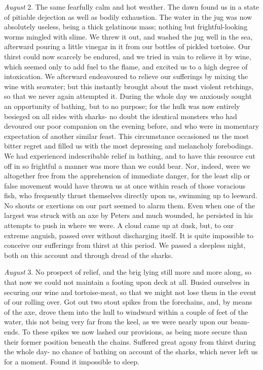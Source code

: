 \emph{August} 2. The same fearfully calm and hot weather. The dawn found us
in a state of pitiable dejection as well as bodily exhaustion. The water in the
jug was now absolutely useless, being a thick gelatinous mass; nothing but
frightful-looking worms mingled with slime. We threw it out, and washed the jug
well in the sea, afterward pouring a little vinegar in it from our bottles of
pickled tortoise. Our thirst could now scarcely be endured, and we tried in vain
to relieve it by wine, which seemed only to add fuel to the flame, and excited
us to a high degree of intoxication. We afterward endeavoured to relieve our
sufferings by mixing the wine with seawater; but this instantly brought about
the most violent retchings, so that we never again attempted it. During the
whole day we anxiously sought an opportunity of bathing, but to no purpose; for
the hulk was now entirely besieged on all sides with sharks- no doubt the
identical monsters who had devoured our poor companion on the evening before,
and who were in momentary expectation of another similar feast. This
circumstance occasioned us the most bitter regret and filled us with the most
depressing and melancholy forebodings. We had experienced indescribable relief
in bathing, and to have this resource cut off in so frightful a manner was more
than we could bear. Nor, indeed, were we altogether free from the apprehension
of immediate danger, for the least slip or false movement would have thrown us
at once within reach of those voracious fish, who frequently thrust themselves
directly upon us, swimming up to leeward. No shouts or exertions on our part
seemed to alarm them. Even when one of the largest was struck with an axe by
Peters and much wounded, he persisted in his attempts to push in where we were.
A cloud came up at dusk, but, to our extreme anguish, passed over without
discharging itself. It is quite impossible to conceive our sufferings from
thirst at this period. We passed a sleepless night, both on this account and
through dread of the sharks. 

\emph{August} 3. No prospect of relief, and the brig lying still more and
more along, so that now we could not maintain a footing upon deck at all. Busied
ourselves in securing our wine and tortoise-meat, so that we might not lose them
in the event of our rolling over. Got out two stout spikes from the forechains,
and, by means of the axe, drove them into the hull to windward within a couple
of feet of the water, this not being very far from the keel, as we were nearly
upon our beam-ends. To these spikes we now lashed our provisions, as being more
secure than their former position beneath the chains. Suffered great agony from
thirst during the whole day- no chance of bathing on account of the sharks,
which never left us for a moment. Found it impossible to sleep. 

